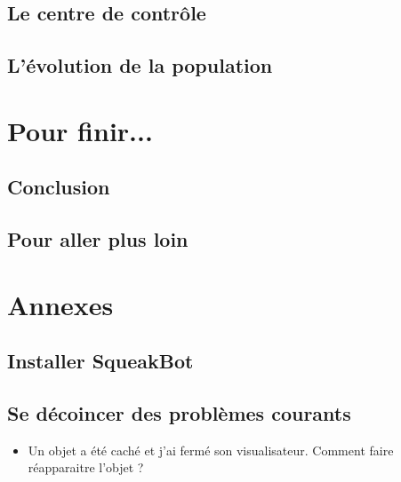 \documentclass[a4paper,12pt]{book}
\def\appName{SqueakBot}
\begin{document}
\section{Le centre de contrôle}

\section{L'évolution de la population}

\chapter{Pour finir...}

\section{Conclusion}

\section{Pour aller plus loin}
\chapter{Annexes}

\section{Installer \appName}

\section{Se décoincer des problèmes courants}

\begin{itemize}
	\item Un objet a été caché et j'ai fermé son visualisateur. Comment faire réapparaitre l'objet ?
\end{itemize}
\end{document}
